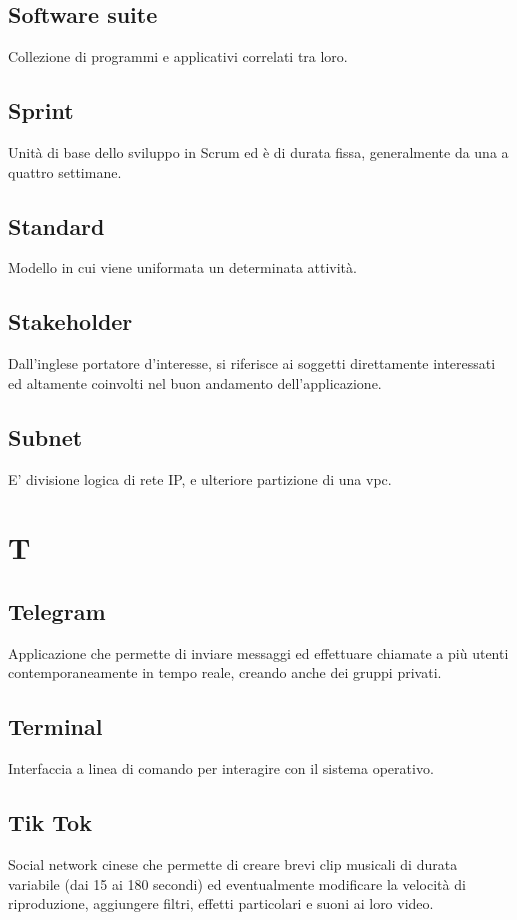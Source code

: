 \documentclass{classes/base}
\begin{document}
        \subsection*{Software suite} 
        Collezione di programmi e applicativi correlati tra loro.
        
        \subsection*{Sprint}
        Unità di base dello sviluppo in Scrum ed è di durata fissa, generalmente da una a quattro settimane.

        \subsection*{Standard}
        Modello in cui viene uniformata un determinata attività.

        \subsection*{Stakeholder} 
        Dall'inglese portatore d'interesse, si riferisce ai soggetti direttamente interessati ed altamente coinvolti nel buon andamento dell'applicazione.

        \subsection*{Subnet}
        E' divisione logica di rete IP, e ulteriore partizione di una vpc.
        \newpage  
    \section{T}
        \subsection*{Telegram}
        Applicazione che permette di inviare messaggi ed effettuare chiamate a più utenti contemporaneamente in tempo reale, creando anche dei gruppi privati.

        \subsection*{Terminal} 
        Interfaccia a linea di comando per interagire con il sistema operativo.
        
        \subsection*{Tik Tok}
        Social network cinese che permette di creare brevi clip musicali di durata variabile (dai 15 ai 180 secondi) ed eventualmente modificare la velocità di riproduzione, aggiungere filtri, effetti particolari e suoni ai loro video.
        
\end{document}
